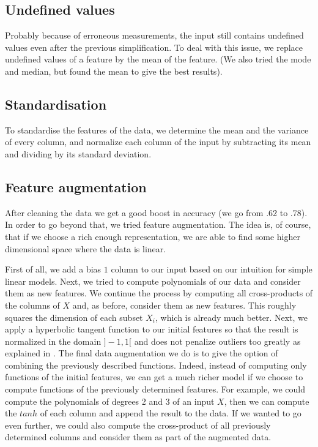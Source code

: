 \documentclass[10pt,conference,compsocconf]{IEEEtran}
\begin{document}
\subsection{Undefined values}

Probably because of erroneous measurements, the input still contains undefined values even after the previous simplification. To deal with this issue, we replace undefined values of a feature by the mean of the feature. (We also tried the mode and median, but found the mean to give the best results).

\subsection{Standardisation}

To standardise the features of the data, we determine the mean and the variance of every column, and normalize each column of the input by subtracting its mean and dividing by its standard deviation. 

\subsection{Feature augmentation}

After cleaning the data we get a good boost in accuracy (we go from .62 to .78). In order to go beyond that, we tried feature augmentation. The idea is, of course, that if we choose a rich enough representation, we are able to find some higher dimensional space where the data is linear.

First of all, we add a bias $1$ column to our input based on our intuition for simple linear models. Next, we tried to compute polynomials of our data and consider them as new features. We continue the process by computing all cross-products of the columns of $X$ and, as before, consider them as new features. This roughly squares the dimension of each subset $X_i$, which is already much better. Next, we apply a hyperbolic tangent function to our initial features so that the result is normalized in the domain $]-1, 1[$ and does not penalize outliers too greatly as explained in \cite{normTechniques}. The final data augmentation we do is to give the option of combining the previously described functions. Indeed, instead of computing only functions of the initial features, we can get a much richer model if we choose to compute functions of the previously determined features. For example, we could compute the polynomials of degrees 2 and 3 of an input $X$, then we can compute the $tanh$ of each column and append the result to the data. If we wanted to go even further, we could also compute the cross-product of all previously determined columns and consider them as part of the augmented data.
\end{document}

